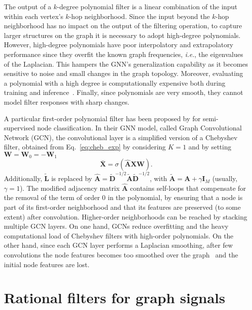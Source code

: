 \documentclass{article}
\def\X{{\mathbf X}}
\def\A{{\mathbf A}}
\def\L{{\mathbf L}}
\def\D{{\mathbf D}}
\def\I{{\mathbf I}}
\def\L{{\mathbf L}}
\begin{document}
The output of a $k$-degree polynomial filter is a linear combination of the input within each vertex's $k$-hop neighborhood. 
Since the input beyond the $k$-hop neighborhood has no impact on the output of the filtering operation, to capture larger structures on the graph it is necessary to adopt high-degree polynomials. 
However, high-degree polynomials have poor interpolatory and extrapolatory performance since they overfit the known graph frequencies, \emph{i.e.}, the eigenvalues of the Laplacian.
This hampers the GNN's generalization capability as it becomes sensitive to noise and small changes in the graph topology.
Moreover, evaluating a polynomial with a high degree is computationally expensive both during training and inference~\cite{isufi2016autoregressive}.
Finally, since polynomials are very smooth, they cannot model filter responses with sharp changes.

A particular first-order polynomial filter has been proposed by \cite{kipf2016semi} for semi-supervised node classification.
In their GNN model, called Graph Convolutional Network (GCN), the convolutional layer is a simplified version of a Chebyshev filter, obtained from Eq.~\eqref{eq:cheb_exp} by considering $K=1$ and by setting $\mathbf{W} = \mathbf{W}_0 = -\mathbf{W}_1$
\begin{equation}
    \label{eq:GCN_layer}
    \bar \X= \sigma\left(\hat{\A}\X\mathbf{W}\right).
\end{equation}
Additionally, $\tilde{\L}$ is replaced by $\hat{\A} = \tilde{\D}^{-1/2}\tilde{\A}\tilde{\D}^{-1/2}$, with $\tilde{\A} = \A + \gamma \I_M$ (usually, $\gamma=1$).
The modified adjacency matrix $\hat{\A}$ contains self-loops that compensate for the removal of the term of order 0 in the polynomial, by ensuring that a node is part of its first-order neighborhood and that its features are preserved (to some extent) after convolution.
Higher-order neighborhoods can be reached by stacking multiple GCN layers.
On one hand, GCNs reduce overfitting and the heavy computational load of Chebyshev filters with high-order polynomials.
On the other hand, since each GCN layer performs a Laplacian smoothing, after few convolutions the node features becomes too smoothed over the graph~\cite{li2018deeper} and the initial node features are lost.



\section{Rational filters for graph signals}
\label{sec:rational_filters}
\end{document}
